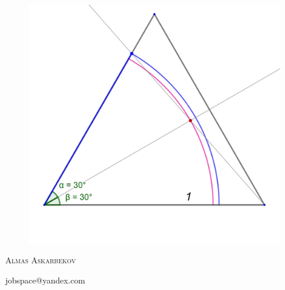 \documentclass[12pt, letterpaper, oneside]{report}
\begin{document}
\begin{titlepage}
\begin{figure}[h]
\centerline{\includegraphics[scale=0.2]{images/ds_tr.jpg}}

\label{logo}
\end{figure}
\textsc{\LARGE Almas Askarbekov }\\[1.5cm]
\begin{center}
	\large {jobspace@yandex.com}\\	
\end{center}
\end{titlepage}
\end{document}
